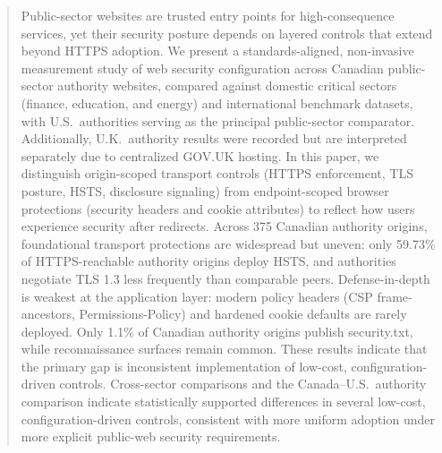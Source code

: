 \documentclass[a4paper,fleqn]{cas-sc}
\begin{document}
\begin{abstract}
Public-sector websites are trusted entry points for high-consequence services, yet their security posture depends on layered controls that extend beyond HTTPS adoption. We present a standards-aligned, non-invasive measurement study of web security configuration across Canadian public-sector authority websites, compared against domestic critical sectors (finance, education, and energy) and international benchmark datasets, with U.S.\ authorities serving as the principal public-sector comparator. Additionally, U.K.\ authority results were recorded but are interpreted separately due to centralized GOV.UK hosting. In this paper, we distinguish origin-scoped transport controls (HTTPS enforcement, TLS posture, HSTS, disclosure signaling) from endpoint-scoped browser protections (security headers and cookie attributes) to reflect how users experience security after redirects. Across 375 Canadian authority origins, foundational transport protections are widespread but uneven: only 59.73\% of HTTPS-reachable authority origins deploy HSTS, and authorities negotiate TLS 1.3 less frequently than comparable peers. Defense-in-depth is weakest at the application layer: modern policy headers (CSP frame-ancestors, Permissions-Policy) and hardened cookie defaults are rarely deployed. Only 1.1\% of Canadian authority origins publish security.txt, while reconnaissance surfaces remain common. These results indicate that the primary gap is inconsistent implementation of low-cost, configuration-driven controls. 
Cross-sector comparisons and the Canada--U.S.\ authority comparison indicate statistically supported differences in several low-cost, configuration-driven controls, consistent with more uniform adoption under more explicit public-web security requirements.
\end{abstract}
\end{document}
